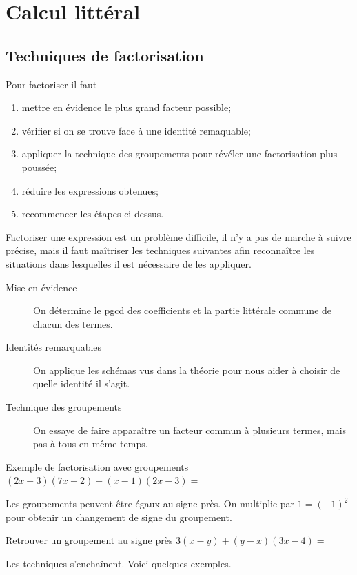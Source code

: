\documentclass[a4paper,12pt]{article}
\begin{document}
\tableofcontents

\newpage
\section{Calcul littéral}

\subsection{Techniques de factorisation}

 Pour factoriser il faut 
  \begin{enumerate}
	  \item mettre en évidence le plus grand facteur possible;
	  \item vérifier si on se trouve face à une identité remaquable;
	  \item appliquer la technique des groupements pour révéler une factorisation plus poussée;
	\item réduire les expressions obtenues;
	\item recommencer les étapes ci-dessus.
\end{enumerate}
Factoriser une expression est un problème difficile, il n'y a pas de marche à suivre précise, mais il faut maîtriser les techniques suivantes afin reconnaître les situations dans lesquelles il est nécessaire de les appliquer.
\begin{description}
\item[Mise en évidence] On détermine le pgcd des coefficients et la partie littérale commune de chacun des termes.
\item[Identités remarquables] On applique les schémas vus dans la théorie pour nous aider à choisir de quelle identité il s'agit.
\item[Technique des groupements] On essaye de faire apparaître un facteur commun à plusieurs termes, mais pas à tous en même temps.
\end{description}

\begin{exemple}
	Exemple de factorisation avec groupements
	\tcblower
$(2x-3)(7x-2)-(x-1)(2x-3)=$
\vspace{4.8cm}

\end{exemple}
Les groupements peuvent être égaux au signe près. On multiplie par $1=(-1)^2$ pour obtenir un changement de signe du groupement.
\begin{exemple}
	Retrouver un groupement au signe près
	\tcblower
	$3(x-y)+(y-x)(3x-4)=$
\vspace{5.8cm}

\end{exemple}
Les techniques s'enchaînent. Voici quelques exemples.
\end{document}
